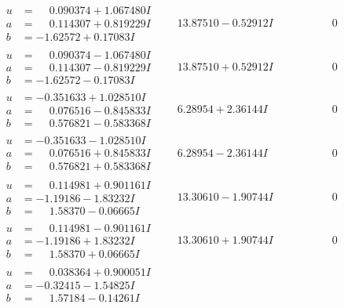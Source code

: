 \documentclass[1p]{elsarticle_modified}
\theoremstyle{definition}
\begin{document}
$$\begin{array}{c|c|c}
\begin{aligned}
u &= \phantom{-}0.090374 + 1.067480 I \\
a &= \phantom{-}0.114307 + 0.819229 I \\
b &= -1.62572 + 0.17083 I\end{aligned}
 & \phantom{-}13.87510 - 0.52912 I & \phantom{-0.000000 } 0 \\ \hline\begin{aligned}
u &= \phantom{-}0.090374 - 1.067480 I \\
a &= \phantom{-}0.114307 - 0.819229 I \\
b &= -1.62572 - 0.17083 I\end{aligned}
 & \phantom{-}13.87510 + 0.52912 I & \phantom{-0.000000 } 0 \\ \hline\begin{aligned}
u &= -0.351633 + 1.028510 I \\
a &= \phantom{-}0.076516 - 0.845833 I \\
b &= \phantom{-}0.576821 - 0.583368 I\end{aligned}
 & \phantom{-}6.28954 + 2.36144 I & \phantom{-0.000000 } 0 \\ \hline\begin{aligned}
u &= -0.351633 - 1.028510 I \\
a &= \phantom{-}0.076516 + 0.845833 I \\
b &= \phantom{-}0.576821 + 0.583368 I\end{aligned}
 & \phantom{-}6.28954 - 2.36144 I & \phantom{-0.000000 } 0 \\ \hline\begin{aligned}
u &= \phantom{-}0.114981 + 0.901161 I \\
a &= -1.19186 - 1.83232 I \\
b &= \phantom{-}1.58370 - 0.06665 I\end{aligned}
 & \phantom{-}13.30610 - 1.90744 I & \phantom{-0.000000 } 0 \\ \hline\begin{aligned}
u &= \phantom{-}0.114981 - 0.901161 I \\
a &= -1.19186 + 1.83232 I \\
b &= \phantom{-}1.58370 + 0.06665 I\end{aligned}
 & \phantom{-}13.30610 + 1.90744 I & \phantom{-0.000000 } 0 \\ \hline\begin{aligned}
u &= \phantom{-}0.038364 + 0.900051 I \\
a &= -0.32415 - 1.54825 I \\
b &= \phantom{-}1.57184 - 0.14261 I\end{aligned}

\end{array}$$
\end{document}
